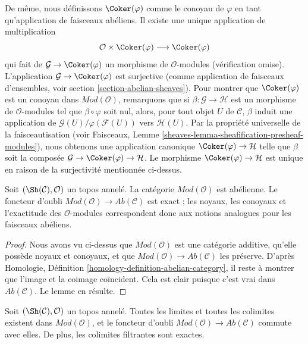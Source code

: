 \medskip\noindent
De même, nous définissons $\Coker(\varphi)$ comme le conoyau de $\varphi$ en
tant qu'application de faisceaux abéliens. Il existe une unique application de
multiplication
$$
\mathcal{O} \times \Coker(\varphi) \longrightarrow \Coker(\varphi)
$$
qui fait de $\mathcal{G} \to \Coker(\varphi)$ un morphisme de
$\mathcal{O}$-modules (vérification omise). L'application
$\mathcal{G} \to \Coker(\varphi)$ est surjective (comme application de
faisceaux d'ensembles, voir section \ref{section-abelian-sheaves}). Pour montrer
que $\Coker(\varphi)$ est un conoyau dans $\textit{Mod}(\mathcal{O})$,
remarquons que si $\beta : \mathcal{G} \to \mathcal{H}$ est un morphisme de
$\mathcal{O}$-modules tel que $\beta \circ \varphi$ soit nul, alors, pour tout
objet $U$ de $\mathcal{C}$, $\beta$ induit une application de
$\mathcal{G}(U)/\varphi(\mathcal{F}(U))$ vers $\mathcal{H}(U)$. Par la
propriété universelle de la faisceautisation (voir Faisceaux, Lemme
\ref{sheaves-lemma-sheafification-presheaf-modules}), nous obtenons une
application canonique $\Coker(\varphi) \to \mathcal{H}$ telle que $\beta$ soit
la composée $\mathcal{G} \to \Coker(\varphi) \to \mathcal{H}$. Le morphisme
$\Coker(\varphi) \to \mathcal{H}$ est unique en raison de la surjectivité
mentionnée ci-dessus.

\begin{lemma}
\label{lemma-abelian}
Soit $(\Sh(\mathcal{C}), \mathcal{O})$ un topos annelé. La catégorie
$\textit{Mod}(\mathcal{O})$ est abélienne. Le foncteur d'oubli
$\textit{Mod}(\mathcal{O}) \to \textit{Ab}(\mathcal{C})$
est exact ; les noyaux, les conoyaux et l'exactitude des
$\mathcal{O}$-modules correspondent donc aux notions analogues pour les
faisceaux abéliens.
\end{lemma}

\begin{proof}
Nous avons vu ci-dessus que $\textit{Mod}(\mathcal{O})$ est une catégorie
additive, qu'elle possède noyaux et conoyaux, et que
$\textit{Mod}(\mathcal{O}) \to \textit{Ab}(\mathcal{C})$ les préserve. D'après
Homologie, Définition \ref{homology-definition-abelian-category}, il reste à
montrer que l'image et la coimage coïncident. Cela est clair puisque c'est vrai
dans $\textit{Ab}(\mathcal{C})$. Le lemme en résulte.
\end{proof}

\begin{lemma}
\label{lemma-limits-colimits}
Soit $(\Sh(\mathcal{C}), \mathcal{O})$ un topos annelé. Toutes les limites et
toutes les colimites existent dans $\textit{Mod}(\mathcal{O})$, et le foncteur
d'oubli
$\textit{Mod}(\mathcal{O}) \to \textit{Ab}(\mathcal{C})$
commute avec elles. De plus, les colimites filtrantes sont exactes.
\end{lemma}

